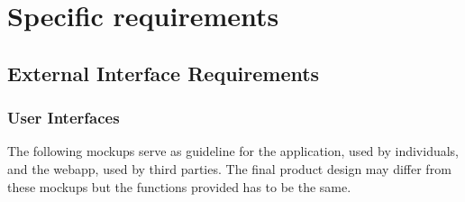 \chapter{Specific requirements}

\section{External Interface Requirements}
\subsection{User Interfaces}
The following mockups serve as guideline for the application, used by individuals, and the webapp, used by third parties. The final product design may differ from these mockups but the functions provided has to be the same.


